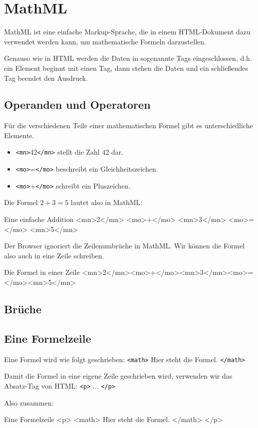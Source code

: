 \section{MathML}

MathML ist eine einfache Markup-Sprache, die in einem HTML-Dokument dazu verwendet werden kann, um mathematische Formeln darzustellen.

Genauso wie in HTML werden die Daten in sogenannte Tags eingeschlossen, d.h. ein Element beginnt mit einen Tag, dann stehen die Daten und ein schließendes Tag beendet den Ausdruck. 

\subsection{Operanden und Operatoren}

Für die verschiedenen Teile einer mathematischen Formel gibt es unterschiedliche Elemente.
\begin{itemize}
	\item \texttt{<mn>}42\texttt{</mn>} stellt die Zahl 42 dar.
	\item \texttt{<mo>}=\texttt{</mo>} beschreibt ein Gleichheitszeichen.
	\item \texttt{<mo>}+\texttt{</mo>} schreibt ein Pluszeichen.
\end{itemize}

Die Formel $2 + 3 = 5$ lautet also in MathML:
\begin{codeHTML}{Eine einfache Addition}
<mn>2</mn>
<mo>+</mo>
<mn>3</mn>
<mo>=</mo>
<mn>5</mn>
\end{codeHTML}

Der Browser ignoriert die Zeilenumbrüche in MathML. Wir können die Formel also auch in eine Zeile schreiben.

\begin{codeHTML}{Die Formel in einer Zeile}
<mn>2</mn><mo>+</mo><mn>3</mn><mo>=</mo><mn>5</mn>
\end{codeHTML}

\subsection{Brüche}

\subsection{Eine Formelzeile}

Eine Formel wird wie folgt geschrieben: \texttt{<math>} Hier steht die Formel. \texttt{</math>}

Damit die Formel in eine eigene Zeile geschrieben wird, verwenden wir das Absatz-Tag von HTML: \texttt{<p>} ... \texttt{</p>}

Also zusammen:
\begin{codeHTML}{Eine Formelzeile}
<p>
	<math>
		Hier steht die Formel.
	</math>
</p>
\end{codeHTML}